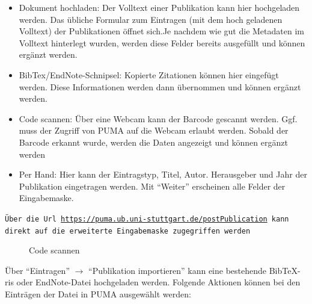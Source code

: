     \begin{itemize}
    	\item Dokument hochladen:\newline
        Der Volltext einer Publikation kann hier hochgeladen werden. Das übliche Formular zum Eintragen (mit dem hoch geladenen Volltext) der Publikationen öffnet sich.Je nachdem wie gut die Metadaten im Volltext hinterlegt wurden, werden diese Felder bereits ausgefüllt und können ergänzt werden.
			\item BibTex/EndNote-Schnipsel:\newline
			Kopierte Zitationen können hier eingefügt werden. Diese Informationen werden dann übernommen und können ergänzt werden.
        \item Code scannen: \newline
Über eine Webcam kann der Barcode gescannt werden. Ggf. muss der Zugriff von PUMA auf die Webcam erlaubt werden. Sobald der Barcode erkannt wurde, werden die Daten angezeigt und können ergänzt werden
        \item Per Hand:
				Hier kann der Eintragstyp, Titel, Autor. Herausgeber und Jahr der Publikation eingetragen werden. Mit \enquote{Weiter} erscheinen alle Felder der Eingabemaske.
    \end{itemize}
\begin{mdframed}[style=tipp]\texttt{Über die Url \url{https://puma.ub.uni-stuttgart.de/postPublication} kann direkt auf die erweiterte Eingabemaske zugegriffen werden} \
\end{mdframed}		
\begin{figure}[h!]
 \centering
 \caption{Code scannen}
 \label{fig:codeScannen}
\end{figure}
Über \enquote{Eintragen} $\to$ \enquote{Publikation importieren} kann eine bestehende BibTeX- ris oder EndNote-Datei hochgeladen werden. Folgende Aktionen können bei den Einträgen der Datei in PUMA ausgewählt werden:
